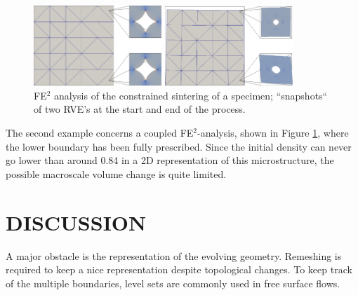 \documentclass{nordic}
\begin{document}
\begin{figure}[htpb]
 \centering
 \includegraphics[width=0.43\textwidth]{figures/Sintering_5x5_000.png}
 \includegraphics[width=0.43\textwidth]{figures/Sintering_5x5_114.png}
 \caption{FE$^2$ analysis of the constrained sintering of a specimen; ``snapshots`` of two RVE's at the start and end of the process.}\label{fig:multiscale}
\end{figure}

The second example concerns a coupled FE$^2$-analysis, shown in Figure \ref{fig:multiscale}, where the lower boundary has been fully prescribed.
Since the initial density can never go lower than around 0.84 in a 2D representation of this microstructure, the possible macroscale volume change is quite limited.

\section{DISCUSSION}
A major obstacle is the representation of the evolving geometry.
Remeshing is required to keep a nice representation despite topological changes.
To keep track of the multiple boundaries, level sets are commonly used in free surface flows.



%
\end{document}
